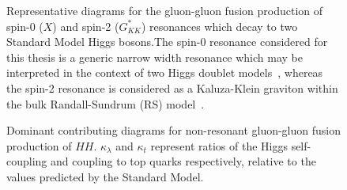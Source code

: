 \begin{figure}[ht]
\centering
{}

\caption{\label{fig:ggF-diagrams-res} Representative diagrams for the gluon-gluon fusion production of spin-0 ($X$) 
and spin-2 ($G_{KK}^{*}$) resonances which decay to two Standard Model Higgs bosons.The spin-0 resonance considered
for this thesis is a generic narrow width resonance which may be interpreted in the context of 
two Higgs doublet models~\cite{2HDM}, whereas the spin-2 resonance is considered as a Kaluza-Klein graviton within the bulk Randall-Sundrum (RS) model~\cite{Gravitons,Carvalho}.}
\end{figure}

\begin{figure}[ht]
\centering
{}

\caption{\label{fig:ggF-diagrams-nonres} Dominant contributing diagrams for non-resonant gluon-gluon fusion production of 
$HH$. $\kappa_{\lambda}$ and $\kappa_{t}$ represent ratios of the Higgs self-coupling and coupling to top quarks 
respectively, relative to the values predicted by the Standard Model.}
\end{figure}

